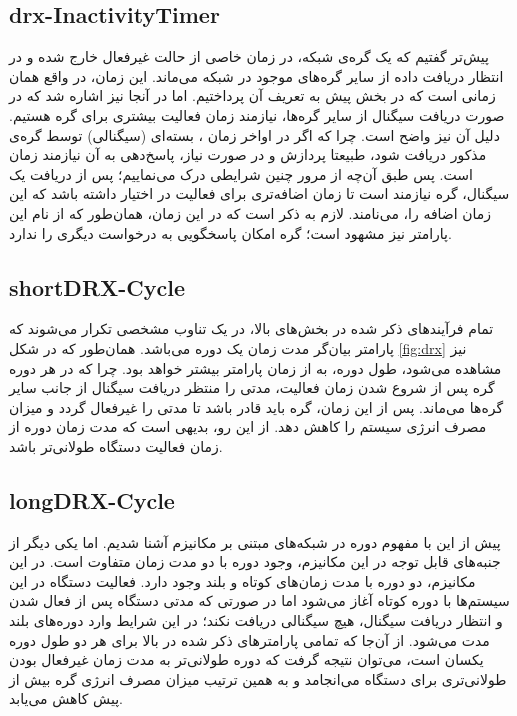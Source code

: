 \subsection{drx-InactivityTimer}
پیش‌تر گفتیم که یک گره‌ی شبکه، در زمان خاصی از حالت غیرفعال خارج شده و در انتظار دریافت داده از سایر گره‌های موجود در شبکه می‌ماند. این زمان، در واقع همان زمانی است که در بخش پیش به تعریف آن پرداختیم. اما در آنجا نیز اشاره شد که در صورت دریافت سیگنال از سایر گره‌ها، نیازمند زمان فعالیت بیشتری برای گره هستیم. دلیل آن نیز واضح است. چرا که اگر در اواخر زمان ، بسته‌ای (سیگنالی) توسط گره‌ی مذکور دریافت شود، طبیعتا پردازش و در صورت نیاز، پاسخ‌دهی به آن نیازمند زمان است. پس طبق آن‌چه از مرور چنین شرایطی درک می‌نماییم؛ پس از دریافت یک سیگنال، گره نیازمند است تا زمان اضافه‌تری برای فعالیت در اختیار داشته باشد که این زمان اضافه را،  می‌نامند. لازم به ذکر است که در این زمان، همان‌طور که از نام این پارامتر نیز مشهود است؛ گره امکان پاسخگویی به درخواست دیگری را ندارد.

\subsection{shortDRX-Cycle}
تمام فرآیندهای ذکر شده در بخش‌های بالا، در یک تناوب مشخصی تکرار می‌شوند که پارامتر  بیان‌گر مدت زمان یک دوره می‌باشد. همان‌طور که در شکل \ref{fig:drx} نیز مشاهده می‌شود، طول دوره، به از زمان پارامتر  بیشتر خواهد بود. چرا که در هر دوره گره پس از شروع شدن زمان فعالیت، مدتی را منتظر دریافت سیگنال از جانب سایر گره‌ها می‌ماند. پس از این زمان، گره باید قادر باشد تا مدتی را غیرفعال گردد و میزان مصرف انرژی سیستم را کاهش دهد. از این رو، بدیهی است که مدت زمان دوره از زمان فعالیت دستگاه طولانی‌تر باشد.

\subsection{longDRX-Cycle}
پیش از این با مفهوم دوره در شبکه‌های مبتنی بر مکانیزم  آشنا شدیم. اما یکی دیگر از جنبه‌های قابل توجه در این مکانیزم، وجود دوره با دو مدت زمان متفاوت است. در این مکانیزم، دو دوره با مدت‌ زمان‌های کوتاه و بلند وجود دارد. فعالیت دستگاه در این سیستم‌ها با دوره کوتاه آغاز می‌شود اما در صورتی که مدتی دستگاه پس از فعال شدن و انتظار دریافت سیگنال، هیچ سیگنالی دریافت نکند؛ در این شرایط وارد دوره‌های بلند مدت می‌شود. از آن‌جا که تمامی پارامتر‌های ذکر شده در بالا برای هر دو طول دوره یکسان است، می‌توان نتیجه گرفت که دوره طولانی‌تر به مدت زمان غیرفعال بودن طولانی‌تری برای دستگاه می‌انجامد و به همین ترتیب میزان مصرف انرژی گره بیش از پیش کاهش می‌یابد.

